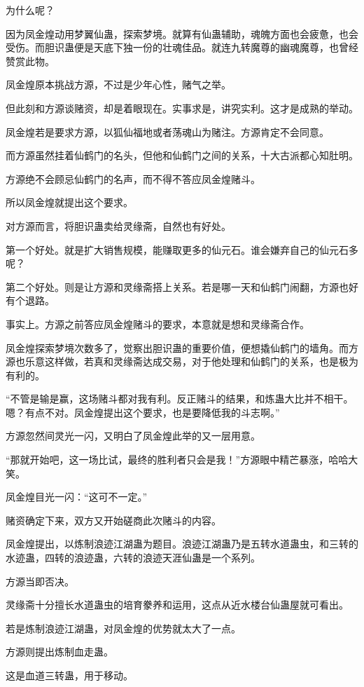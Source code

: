 \begin{this_body}
为什么呢？

因为凤金煌动用梦翼仙蛊，探索梦境。就算有仙蛊辅助，魂魄方面也会疲惫，也会受伤。而胆识蛊便是天底下独一份的壮魂佳品。就连九转魔尊的幽魂魔尊，也曾经赞赏此物。

凤金煌原本挑战方源，不过是少年心性，赌气之举。

但此刻和方源谈赌资，却是着眼现在。实事求是，讲究实利。这才是成熟的举动。

凤金煌若是要求方源，以狐仙福地或者荡魂山为赌注。方源肯定不会同意。

而方源虽然挂着仙鹤门的名头，但他和仙鹤门之间的关系，十大古派都心知肚明。

方源绝不会顾忌仙鹤门的名声，而不得不答应凤金煌赌斗。

所以凤金煌就提出这个要求。

对方源而言，将胆识蛊卖给灵缘斋，自然也有好处。

第一个好处。就是扩大销售规模，能赚取更多的仙元石。谁会嫌弃自己的仙元石多呢？

第二个好处。则是让方源和灵缘斋搭上关系。若是哪一天和仙鹤门闹翻，方源也好有个退路。

事实上。方源之前答应凤金煌赌斗的要求，本意就是想和灵缘斋合作。

凤金煌探索梦境次数多了，觉察出胆识蛊的重要价值，便想撬仙鹤门的墙角。而方源也乐意这样做，若真和灵缘斋达成交易，对于他处理和仙鹤门的关系，也是极为有利的。

“不管是输是赢，这场赌斗都对我有利。反正赌斗的结果，和炼蛊大比并不相干。嗯？有点不对。凤金煌提出这个要求，也是要降低我的斗志啊。”

方源忽然间灵光一闪，又明白了凤金煌此举的又一层用意。

“那就开始吧，这一场比试，最终的胜利者只会是我！”方源眼中精芒暴涨，哈哈大笑。

凤金煌目光一闪：“这可不一定。”

赌资确定下来，双方又开始磋商此次赌斗的内容。

凤金煌提出，以炼制浪迹江湖蛊为题目。浪迹江湖蛊乃是五转水道蛊虫，和三转的水迹蛊，四转的浪迹蛊，六转的浪迹天涯仙蛊是一个系列。

方源当即否决。

灵缘斋十分擅长水道蛊虫的培育豢养和运用，这点从近水楼台仙蛊屋就可看出。

若是炼制浪迹江湖蛊，对凤金煌的优势就太大了一点。

方源则提出炼制血走蛊。

这是血道三转蛊，用于移动。


\end{this_body}
